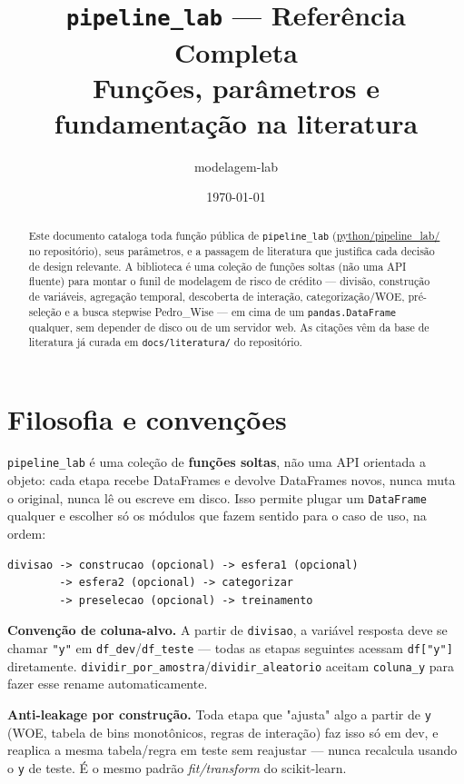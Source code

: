 \documentclass[11pt]{article}
\title{\texttt{pipeline\_lab} --- Referência Completa\\
\large Funções, parâmetros e fundamentação na literatura}
\author{modelagem-lab}
\date{\today}
\begin{document}
\maketitle

\begin{abstract}
\noindent Este documento cataloga toda função pública de \texttt{pipeline\_lab}
(\url{python/pipeline_lab/} no repositório), seus parâmetros, e a passagem de
literatura que justifica cada decisão de design relevante. A biblioteca é uma
coleção de funções soltas (não uma API fluente) para montar o funil de
modelagem de risco de crédito --- divisão, construção de variáveis, agregação
temporal, descoberta de interação, categorização/WOE, pré-seleção e a busca
stepwise Pedro\_Wise --- em cima de um \texttt{pandas.DataFrame} qualquer, sem
depender de disco ou de um servidor web. As citações vêm da base de
literatura já curada em \texttt{docs/literatura/} do repositório.
\end{abstract}

\tableofcontents
\newpage

\section{Filosofia e convenções}

\texttt{pipeline\_lab} é uma coleção de \textbf{funções soltas}, não uma API
orientada a objeto: cada etapa recebe DataFrames e devolve DataFrames novos,
nunca muta o original, nunca lê ou escreve em disco. Isso permite plugar um
\texttt{DataFrame} qualquer e escolher só os módulos que fazem sentido para o
caso de uso, na ordem:

\begin{lstlisting}
divisao -> construcao (opcional) -> esfera1 (opcional)
        -> esfera2 (opcional) -> categorizar
        -> preselecao (opcional) -> treinamento
\end{lstlisting}

\textbf{Convenção de coluna-alvo.} A partir de \texttt{divisao}, a variável
resposta deve se chamar \texttt{"y"} em \texttt{df\_dev}/\texttt{df\_teste} ---
todas as etapas seguintes acessam \texttt{df["y"]} diretamente.
\texttt{dividir\_por\_amostra}/\texttt{dividir\_aleatorio} aceitam
\texttt{coluna\_y} para fazer esse rename automaticamente.

\textbf{Anti-leakage por construção.} Toda etapa que "ajusta" algo a partir de
\texttt{y} (WOE, tabela de bins monotônicos, regras de interação) faz isso só
em dev, e reaplica a mesma tabela/regra em teste sem reajustar --- nunca
recalcula usando o \texttt{y} de teste. É o mesmo padrão \emph{fit/transform}
do scikit-learn.
\end{document}
